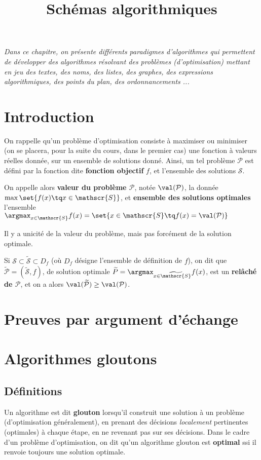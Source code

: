 \documentclass{scrartcl}
\title{Schémas algorithmiques}
\author{}
\date{}
\begin{document}
	\maketitle
	\begin{center}
		\textsl{Dans ce chapitre, on présente différents paradigmes d'algorithmes qui permettent de développer des algorithmes résolvant des problèmes (d'optimisation)
		mettant en jeu des textes, des noms, des listes, des graphes, des expressions algorithmiques, des points du plan, des ordonnancements ...}
	\end{center}

	\section{Introduction}
		On rappelle qu'un problème d'optimisation consiste à maximiser ou minimiser (on se placera, pour la suite du cours, dans le premier cas) une fonction à valeurs réelles donnée, 
		sur un ensemble de solutions donné. 
		Ainsi, un tel problème $\mathcal{P}$ est défini par la fonction dite \textbf{fonction objectif} $f$, 
		et l'ensemble des solutions $\mathscr{S}$.
		
		On appelle alors \textbf{valeur du problème $\mathcal{P}$}, notée $\val(\mathcal{P})$, la donnée $\max \set{f(x) \tq x \in \mathscr{S}}$,
		et \textbf{ensemble des solutions optimales} l'ensemble $\argmax_{x\in\mathscr{S}} f(x) = \set{x \in \mathscr{S} \tq f(x) = \val(\mathcal{P})}$
	
		\rem Il y a unicité de la valeur du problème, mais pas forcément de la solution optimale.

		Si $\mathscr{S} \subset \widetilde{\mathscr{S}} \subset D_f$ (où $D_f$ désigne l'ensemble de définition de $f$), 
		on dit que $\widetilde{\mathcal{P}} = (\widetilde{\mathscr{S}},f)$, 
		de solution optimale $\widetilde{P} = \argmax_{x \in \widetilde{\mathscr{S}}} f(x)$, 
		est un \textbf{relâché de $\mathcal{P}$}, et on a alors $\val(\widetilde{\mathcal{P}}) \geq \val(\mathcal{P})$. 
		
		\warnwipnext
	\section{Preuves par argument d'échange}
	\section{Algorithmes gloutons}
		\subsection{Définitions}
			Un algorithme est dit \textbf{glouton} lorsqu'il construit une solution à un problème (d'optimisation généralement), 
			en prenant des décisions \textsl{localement} pertinentes (optimales) à chaque étape, en ne revenant pas sur ses décisions.
			Dans le cadre d'un problème d'optimisation, on dit qu'un algorithme glouton est \textbf{optimal} ssi il renvoie toujours une solution optimale.
			
\end{document}
